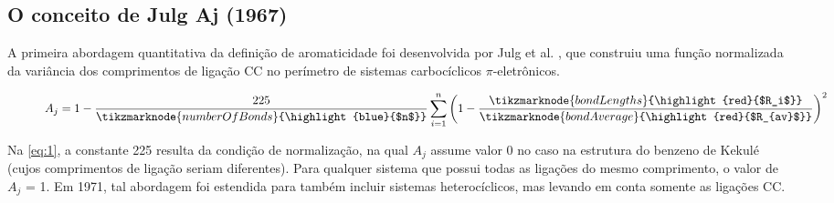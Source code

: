 \subsection{O conceito de Julg Aj (1967)}

A primeira abordagem quantitativa da definição de aromaticidade foi desenvolvida por Julg et al. \autocite{Julg1967, Bergmann1971}, que construiu uma função normalizada da variância dos comprimentos de ligação CC no perímetro de sistemas carbocíclicos $\pi$-eletrônicos.

\begin{figure}[htb]
    \vspace{2\baselineskip}
\begin{equation}
    \label{eq:1}
    A_j = 1 - \frac{225}{\tikzmarknode{numberOfBonds}{\highlight{blue}{$n$}}} \sum^n_{i=1} \bigg{(}1 - \frac{\tikzmarknode{bondLengths}{\highlight{red}{$R_i$}}}{\tikzmarknode{bondAverage}{\highlight{red}{$R_{av}$}}} \bigg{)}^2
\end{equation}
    \vspace{4\baselineskip}
\end{figure}

Na \autoref{eq:1}, a constante 225 resulta da condição de normalização, na qual $A_j$ assume valor 0 no caso na estrutura do benzeno de Kekulé (cujos comprimentos de ligação seriam diferentes). Para qualquer sistema que possui todas as ligações do mesmo comprimento, o valor de $A_j$ = 1. Em 1971, tal abordagem foi estendida para também incluir sistemas heterocíclicos, mas levando em conta somente as ligações CC.

